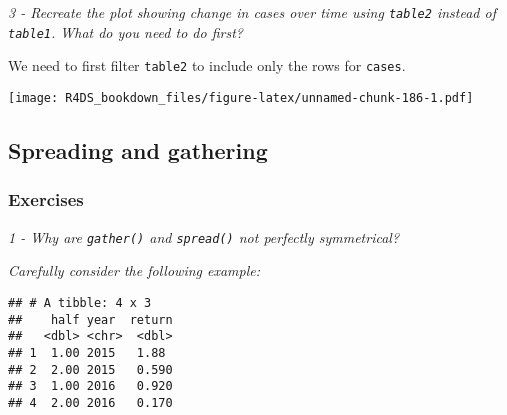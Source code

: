 \documentclass[]{article}
\newenvironment{Shaded}{\begin{snugshade}}{\end{snugshade}}
\newcommand{\KeywordTok}[1]{\textcolor[rgb]{0.13,0.29,0.53}{\textbf{#1}}}
\newcommand{\DataTypeTok}[1]{\textcolor[rgb]{0.13,0.29,0.53}{#1}}
\newcommand{\DecValTok}[1]{\textcolor[rgb]{0.00,0.00,0.81}{#1}}
\newcommand{\StringTok}[1]{\textcolor[rgb]{0.31,0.60,0.02}{#1}}
\newcommand{\OperatorTok}[1]{\textcolor[rgb]{0.81,0.36,0.00}{\textbf{#1}}}
\newcommand{\NormalTok}[1]{#1}
\theoremstyle{definition}
\theoremstyle{definition}
\theoremstyle{definition}
\theoremstyle{remark}
\begin{document}
\emph{3 - Recreate the plot showing change in cases over time using
\texttt{table2} instead of \texttt{table1}. What do you need to do
first?}

We need to first filter \texttt{table2} to include only the rows for
\texttt{cases}.

\begin{Shaded}
\end{Shaded}

\texttt{[image: R4DS\_bookdown\_files/figure-latex/unnamed-chunk-186-1.pdf]}

\subsection{Spreading and gathering}\label{spreading-and-gathering}

\subsubsection{Exercises}\label{exercises-22}

\emph{1 - Why are \texttt{gather()} and \texttt{spread()} not perfectly
symmetrical?}

\emph{Carefully consider the following example:}

\begin{verbatim}
## # A tibble: 4 x 3
##    half year  return
##   <dbl> <chr>  <dbl>
## 1  1.00 2015   1.88 
## 2  2.00 2015   0.590
## 3  1.00 2016   0.920
## 4  2.00 2016   0.170
\end{verbatim}
\end{document}
